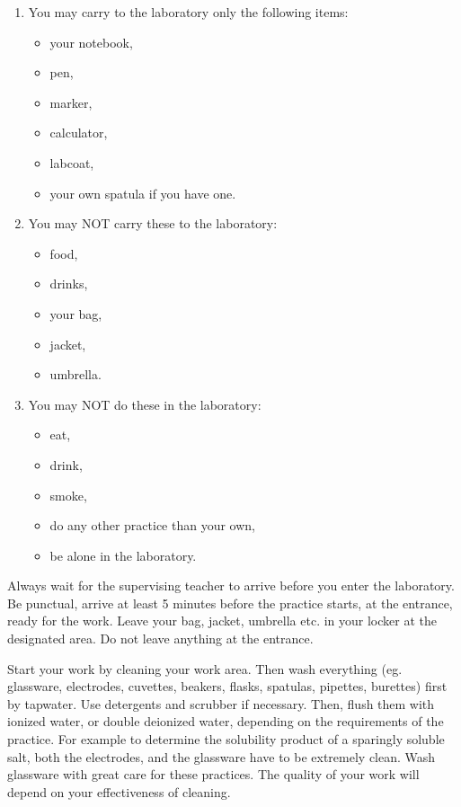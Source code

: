 \begin{enumerate}
\item You may carry to the laboratory only the following items:
	\begin{itemize}
	\item your notebook,
	\item pen,
	\item marker,
	\item calculator,
	\item labcoat,
	\item your own spatula if you have one.
	\end{itemize}
\item You may NOT carry these to the laboratory:
	\begin{itemize}
	\item food,
	\item drinks,
	\item your bag,
	\item jacket,
	\item umbrella.
	\end{itemize}
\item You may NOT do these in the laboratory:
	\begin{itemize}
	\item eat,
	\item drink,
	\item smoke,
	\item do any other practice than your own,
	\item be alone in the laboratory.
	\end{itemize}
\end{enumerate}

Always wait for the supervising teacher to arrive before you enter the laboratory. Be punctual, arrive at least 5 minutes before the practice starts, at the entrance, ready for the work. Leave your bag, jacket, umbrella etc. in your locker at the designated area. Do not leave anything at the entrance.
	
Start your work by cleaning your work area. Then wash everything (eg. glassware, electrodes, cuvettes, beakers, flasks, spatulas, pipettes, burettes) first by tapwater. Use detergents and scrubber if necessary. Then, flush them with ionized water, or double deionized water, depending on the requirements of the practice. For example to determine the solubility product of a sparingly soluble salt, both the electrodes, and the glassware have to be extremely clean. Wash glassware with great care for these practices. The quality of your work will depend on your effectiveness of cleaning.

